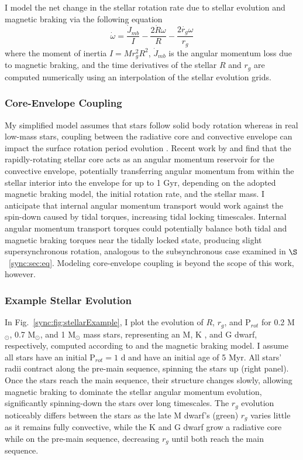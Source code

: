 I model the net change in the stellar rotation rate due to stellar evolution and magnetic braking via the following equation 
\begin{equation} \label{sync:eqn:stellar_rot_rate_dt}
\dot{\omega} = \frac{\dot{J}_{mb}}{I} - \frac{2 \dot{R} \omega}{R} - \frac{2 \dot{r_g} \omega}{r_g}
\end{equation}
where the moment of inertia $I = M r_g^2 R^2$, $\dot{J}_{mb}$ is the angular momentum loss due to magnetic braking, and the time derivatives of the stellar $R$ and $r_g$ are computed numerically using an interpolation of the \citet{Baraffe2015} stellar evolution grids.  

\subsubsection{Core-Envelope Coupling} \label{sync:sec:methods:twoLayer}

My simplified model assumes that stars follow solid body rotation whereas in real low-mass stars, coupling between the radiative core and convective envelope can impact the surface rotation period evolution \citep{MacGregor1991,Allain1998,Bouvier2008,Irwin2009}. Recent work by \citet{Gallet2013} and \citet{Gallet2015} find that the rapidly-rotating stellar core acts as an angular momentum reservoir for the convective envelope, potentially transferring angular momentum from within the stellar interior into the envelope for up to 1 Gyr, depending on the adopted magnetic braking model, the initial rotation rate, and the stellar mass. I anticipate that internal angular momentum transport would work against the spin-down caused by tidal torques, increasing tidal locking timescales. Internal angular momentum transport torques could potentially balance both tidal and magnetic braking torques near the tidally locked state, producing slight supersynchronous rotation, analogous to the subsynchronous case examined in $\S$~\ref{sync:sec:eq}. Modeling core-envelope coupling is beyond the scope of this work, however.

\subsubsection{Example Stellar Evolution} \label{sync:sec:methods:exampleStellar}

In Fig.~\ref{sync:fig:stellarExample}, I plot the evolution of $R$, $r_g$, and P$_{rot}$ for 0.2 M$_{\odot}$, 0.7 M$_{\odot}$, and 1 M$_{\odot}$ mass stars, representing an M, K , and G dwarf, respectively, computed according to \stellar and the \citet{Matt2015} magnetic braking model. I assume all stars have an initial P$_{rot} = 1$ d and have an initial age of 5 Myr. All stars' radii contract along the pre-main sequence, spinning the stars up (right panel). Once the stars reach the main sequence, their structure changes slowly, allowing magnetic braking to dominate the stellar angular momentum evolution, significantly spinning-down the stars over long timescales. The $r_g$ evolution noticeably differs between the stars as the late M dwarf's (green) $r_g$ varies little as it remains fully convective, while the K and G dwarf grow a radiative core while on the pre-main sequence, decreasing $r_g$ until both reach the main sequence.

